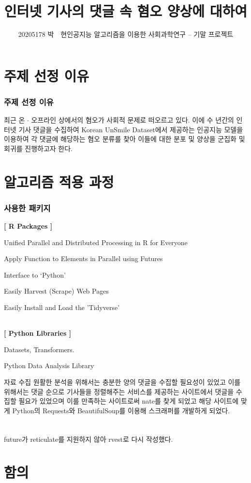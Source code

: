 \documentclass[mathserif, aspectratio=169]{beamer}
\title{인터넷 기사의 댓글 속 혐오 양상에 대하여}
\author{20205178 박~~현\hfill 인공지능 알고리즘을 이용한 사회과학연구 -- 기말 프로젝트}
\institute{}
\date{}
\begin{document}
\frame{\titlepage}

\section{주제 선정 이유}
\begin{frame}
    \frametitle{주제 선정 이유}
    \justifying
    최근 온 $\cdot$ 오프라인 상에서의 혐오가 사회적 문제로 떠오르고 있다.
    이에 수 년간의 인터넷 기사 댓글을 수집하여 Korean UnSmile Dataset에서 제공하는 인공지능 모델을
    이용하여 각 댓글에 해당하는 혐오 분류를 찾아 이들에 대한 분포 및 양상을 군집화 및 회귀를 진행하고자 한다.
\end{frame}
\section{알고리즘 적용 과정}
\begin{frame}
    \frametitle{사용한 패키지}
    \textbf{[ R Packages ]}
    \begin{description}[labelwidth=3cm]
        \item [future:] Unified Parallel and Distributed Processing in R for Everyone
        \item [future.apply:] Apply Function to Elements in Parallel using Futures
        \item [reticulate:]  Interface to `Python'
        \item [rvest:] Easily Harvest (Scrape) Web Pages
        \item [tidyverse:] Easily Install and Load the 'Tidyverse'
    \end{description}
    ~\\
    \textbf{[ Python Libraries ]}
    \begin{description}[labelwidth=3cm]
        \item [Hugging Face:] Datasets, Transformers.
        \item [Pandas:] Python Data Analysis Library
    \end{description}
\end{frame}
\begin{frame}{자료 수집}
    \justifying
    원활한 분석을 위해서는 충분한 양의 댓글을 수집할 필요성이 있었고
    이를 위해서는 댓글 순으로 기사들을 정렬해주는 서비스를 제공하는 
    사이트에서 댓글을 수집할 필요가 있었으며 이를 만족하는 사이트로써
    nate를 찾게 되었고 해당 사이트에 맞게 Python의 Requests와 BeautifulSoup를 이용해
    스크래퍼를 개발하게 되었다.\\~\\~\\
    \hfill{} future가 reticulate를 지원하지 않아 rvest로 다시 작성했다.
\end{frame}
\section{함의}
\end{document}
